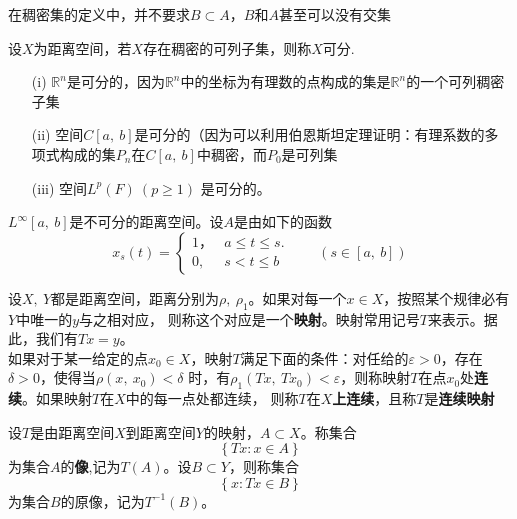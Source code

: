 \begin{note}
    在稠密集的定义中，并不要求$ B \subset A$，$B$和$A$甚至可以没有交集
\end{note}

\begin{newdef}
    设$X$为距离空间，若$X$存在稠密的可列子集，则称$X$可分.
\end{newdef}

\begin{newex}
    \begin{itemize}
        \item [(i)] $\mathbb R^n$是可分的，因为$\mathbb{ R}^n$中的坐标为有理数的点构成的集是$\mathbb{R}^n$的一个可列稠密子集
        \item [(ii)] 空间$C[a , \ b]$是可分的（因为可以利用伯恩斯坦定理证明：有理系数的多项式构成的集$P_n$在$C[a,\  b]$中稠密，而$P_0$是可列集
        \item [(iii)] 空间$L^p(F)\ (p \geqslant 1)$ 是可分的。
    \end{itemize}
\end{newex}

\begin{newex}
    $L^\infty \left[a, \ b\right]$是不可分的距离空间。设$A$是由如下的函数
   \begin{equation*}
       x_s(t)=
       \begin{cases}
           1， & a\leqslant t \leqslant s.\\
           0,  & s < t \leqslant b
       \end{cases} \qquad
       (s \in \left[a,\ b\right])
 \end{equation*}
\end{newex}

\begin{newdef}
    设$X,\ Y$都是距离空间，距离分别为$\rho, \ \rho_1$。如果对每一个$x \in X$，按照某个规律必有$Y$中唯一的$y$与之相对应，
    则称这个对应是一个\textbf{映射}。映射常用记号$T$来表示。据此，我们有$Tx=y$。\\
    如果对于某一给定的点$x_0 \in X$，映射$T$满足下面的条件：对任给的$ \varepsilon >0$，存在$\delta >0$，使得当$\rho (x,\ x_0)<\delta$
    时，有$\rho_1(Tx,\ Tx_0)<\varepsilon$，则称映射$T$在点$x_0$处\textbf{连续}。如果映射$T$在$X$中的每一点处都连续，
    则称$T$在\textbf{$X$上连续}，且称$T$是\textbf{连续映射}
\end{newdef}

\begin{newdef}
    设$T$是由距离空间$X$到距离空间$Y$的映射，$A \subset X$。称集合
    $$\left\{ Tx \colon x \in A \right\} $$
    为集合$A$的\textbf{像},记为$T(A)$。设$B \subset Y$，则称集合$$\left\{ x \colon Tx \in B \right\}$$
    为集合$B$的原像，记为$T^{-1}(B)$。
\end{newdef}

